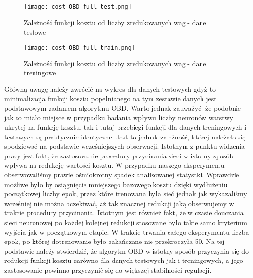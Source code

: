 \begin{figure}[!h]
  \label{fig:Koszt-OBD-full-test}
  \centering \texttt{[image: cost\_OBD\_full\_test.png]}
  \caption{Zależność funkcji kosztu od liczby zredukowanych wag - dane testowe}

  \vspace*{\floatsep}%

 \label{fig:Koszt-OBD-full-train}
  \centering \texttt{[image: cost\_OBD\_full\_train.png]}
  \caption{Zależność funkcji kosztu od liczby zredukowanych wag - dane treningowe}
\end{figure}

\par Główną uwagę należy zwrócić na wykres dla danych testowych gdyż to minimalizacja funkcji kosztu popełnianego na tym zestawie danych jest podstawowym zadaniem algorytmu OBD. Warto jednak zauważyć, że podobnie jak to miało miejsce w przypadku badania wpływu liczby neuronów warstwy ukrytej na funkcję kosztu, tak i tutaj przebiegi funkcji dla danych treningowych i testowych są praktycznie identyczne. Jest to jednak zależność, której należało się spodziewać na podstawie wcześniejszych obserwacji. Istotnym z punktu widzenia pracy jest fakt, że zastosowanie procedury przycinania sieci w istotny sposób wpływa na redukcję wartości kosztu. W przypadku naszego eksperymentu obserwowaliśmy prawie ośmiokrotny spadek analizowanej statystki. Wprawdzie możliwe było by osiągnięcie mniejszego bazowego kosztu dzięki wydłużeniu początkowej liczby epok, przez które trenowana była sieć jednak jak wykazaliśmy wcześniej nie można oczekiwać, aż tak znacznej redukcji jaką obserwujemy w trakcie procedury przycinania. Istotnym jest również fakt, że w czasie douczania sieci neuronowej po każdej kolejnej redukcji stosowane było takie samo kryterium wyjścia jak w początkowym etapie. W trakcie trwania całego eksperymentu liczba epok, po której dotrenowanie było zakańczane nie przekroczyła 50. Na tej podstawie należy stwierdzić, że algorytm OBD w istotny sposób przyczynia się do redukcji funkcji kosztu zarówno dla danych testowych jak i treningowych, a jego zastosowanie powinno przyczynić się do większej stabilności regulacji. 
